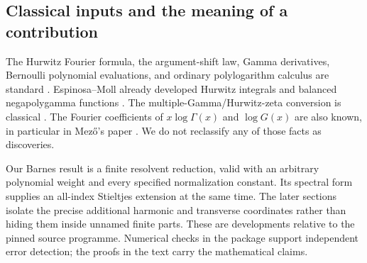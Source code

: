 \subsection{Classical inputs and the meaning of a contribution}

The Hurwitz Fourier formula, the argument-shift law, Gamma
derivatives, Bernoulli polynomial evaluations, and ordinary
polylogarithm calculus are standard \cite{bhr:DLMFZ,bhr:DLMFG}.
Espinosa--Moll already developed Hurwitz integrals and balanced
negapolygamma functions \cite{bhr:EMIntegrals,bhr:EMGeneralized}.
The multiple-Gamma/Hurwitz-zeta conversion is classical
\cite{bhr:Adamchik,bhr:Vardi}. The Fourier coefficients of
$x\log\Gamma(x)$ and $\log G(x)$ are also known, in particular in
Mez\H{o}'s paper \cite{bhr:Mezo}. We do not reclassify any of those
facts as discoveries.

Our Barnes result is a finite resolvent reduction, valid with an
arbitrary polynomial weight and every specified normalization
constant. Its spectral form supplies an all-index Stieltjes
extension at the same time. The later sections isolate the precise
additional harmonic and transverse coordinates rather than hiding
them inside unnamed finite parts. These are developments relative
to the pinned source programme. Numerical checks in the package
support independent error detection; the proofs in the text carry
the mathematical claims.
